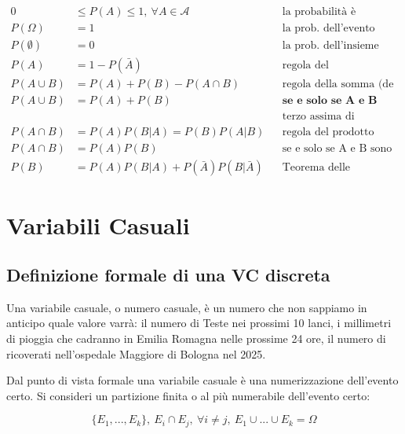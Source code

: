 \documentclass[
  11pt,
]{book}
\theoremstyle{mytheoremstyle}
\theoremstyle{mydefstyle}
\begin{document}
\begin{info2}

\begin{align*}
0&\le P(A) \le 1,~\forall A\in\mathscr{A} &&\text{la probabilità è compresa tra 0 e 1.} \\ 
 P(\Omega)&=1 &&\text{la prob. dell'evento certo è 1,} \\ 
P(\emptyset)&=0 &&\text{la prob. dell'insieme vuoto è zero.} \\ 
P(A)&=1-P(\bar A) &&\text{regola del complementare} \\ 
P(A\cup B)&=P(A)+P(B)-P(A\cap B) &&\text{regola della somma (de Morgan)} \\ 
P(A\cup B)&=P(A)+P(B) &&\textbf{se e solo se A e B sono incompatibili:} \\ 
& &&\text{terzo assima di Kolmogorov} \\ 
P(A\cap B)&=P(A)P(B|A)=P(B)P(A|B) &&\text{regola del prodotto (chain rule)} \\ 
P(A\cap B)&=P(A)P(B) &&\text{se e solo se A e B sono indipendenti} \\ 
P(B)&=P(A)P(B|A)+P(\bar A)P(B|\bar A) &&\text{Teorema delle probabilità totali} 
\end{align*}

\end{info2}

\normalsize

\chapter{Variabili Casuali}\label{variabili-casuali}

\section{Definizione formale di una VC discreta}\label{definizione-formale-di-una-vc-discreta}

Una variabile casuale, o numero casuale, è un numero che non sappiamo in anticipo
quale valore varrà: il numero di Teste nei prossimi 10 lanci, i millimetri di
pioggia che cadranno in Emilia Romagna nelle prossime 24 ore, il numero di ricoverati
nell'ospedale Maggiore di Bologna nel 2025.

Dal punto di vista formale una variabile casuale è una numerizzazione dell'evento
certo. Si consideri un partizione finita o al più numerabile dell'evento certo:

\[
\{E_1,...,E_k\},~E_i\cap E_j,~\forall i\ne j, ~E_1\cup...\cup E_k=\Omega
\]
\end{document}
